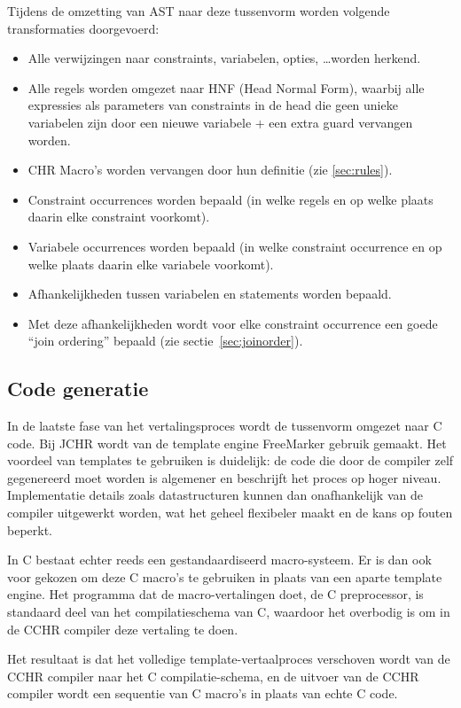 Tijdens de omzetting van AST naar deze tussenvorm worden volgende transformaties doorgevoerd: \begin{itemize}
\item Alle verwijzingen naar constraints, variabelen, opties, \ldots worden herkend.
\item Alle regels worden omgezet naar HNF (Head Normal Form), waarbij alle expressies als parameters van constraints in de head die geen unieke variabelen zijn door een nieuwe variabele + een extra guard vervangen worden.
\item CHR Macro's worden vervangen door hun definitie (zie \ref{sec:rules}).
\item Constraint occurrences worden bepaald (in welke regels en op welke plaats daarin elke constraint voorkomt).
\item Variabele occurrences worden bepaald (in welke constraint occurrence en op welke plaats daarin elke variabele voorkomt).
\item Afhankelijkheden tussen variabelen en statements worden bepaald.
\item Met deze afhankelijkheden wordt voor elke constraint occurrence een goede ``join ordering'' bepaald (zie sectie~\ref{sec:joinorder}).
\end{itemize}

\subsection{Code generatie} \label{sec:codegen}

In de laatste fase van het vertalingsproces wordt de tussenvorm omgezet naar C code. Bij JCHR wordt van de template engine FreeMarker gebruik gemaakt. Het voordeel van templates te gebruiken is duidelijk: de code die door de compiler zelf gegenereerd moet worden is algemener en beschrijft het proces op hoger niveau. Implementatie details zoals datastructuren kunnen dan onafhankelijk van de compiler uitgewerkt worden, wat het geheel flexibeler maakt en de kans op fouten beperkt.

In C bestaat echter reeds een gestandaardiseerd macro-systeem. Er is dan ook voor gekozen om deze C macro's te gebruiken in plaats van een aparte template engine. Het programma dat de macro-vertalingen doet, de C preprocessor, is standaard deel van het compilatieschema van C, waardoor het overbodig is om in de CCHR compiler deze vertaling te doen.

Het resultaat is dat het volledige template-vertaalproces verschoven wordt van de CCHR compiler naar het C compilatie-schema, en de uitvoer van de CCHR compiler wordt een sequentie van C macro's in plaats van echte C code.

